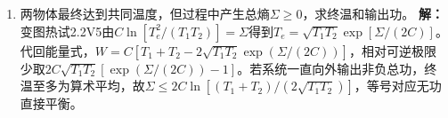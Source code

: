 \documentclass[UTF8,fontset=fandol,a4paper,11pt]{ctexart}
\begin{document}
\begin{enumerate}
\item 两物体最终达到共同温度，但过程中产生总熵$\Sigma\ge0$，求终温和输出功。
\textbf{解：}变图热试2.2V5由$C\ln[T_e^2/(T_1T_2)]=\Sigma$得到$T_e=\sqrt{T_1T_2}\exp[\Sigma/(2C)]$。代回能量式，$W=C[T_1+T_2-2\sqrt{T_1T_2}\exp(\Sigma/(2C))]$，相对可逆极限少取$2C\sqrt{T_1T_2}[\exp(\Sigma/(2C))-1]$。若系统一直向外输出非负总功，终温至多为算术平均，故$\Sigma\le2C\ln[(T_1+T_2)/(2\sqrt{T_1T_2})]$，等号对应无功直接平衡。
\begin{center}\begin{minipage}{.98\linewidth}\centering
{}
\end{minipage}
\end{center}
\end{enumerate}
\end{document}

